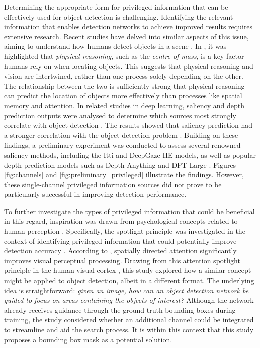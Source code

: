 Determining the appropriate form for privileged information that can be effectively used for object detection is challenging. Identifying the relevant information that enables detection networks to achieve improved results requires extensive research. Recent studies have delved into similar aspects of this issue, aiming to understand how humans detect objects in a scene \cite{object_detection_philospy}. In \cite{object_detection_philospy}, it was highlighted that \textit{physical reasoning}, such as the \textit{centre of mass}, is a key factor humans rely on when locating objects. This suggests that physical reasoning and vision are intertwined, rather than one process solely depending on the other. The relationship between the two is sufficiently strong that physical reasoning can predict the location of objects more effectively than processes like spatial memory and attention.
In related studies in deep learning, saliency \cite{itti, deepgaze} and depth prediction \cite{depth_anything, dpt_large} outputs were analysed to determine which sources most strongly correlate with object detection \cite{bartolo2024correlationobjectdetectionperformance}. The results showed that saliency prediction had a stronger correlation with the object detection problem \cite{bartolo2024correlationobjectdetectionperformance}. Building on these findings, a preliminary experiment was conducted to assess several renowned saliency methods, including the Itti \cite{itti} and DeepGaze IIE \cite{deepgaze} models, as well as popular depth prediction models such as Depth Anything \cite{depth_anything} and DPT-Large \cite{dpt_large}. Figures \ref{fig:channels} and \ref{fig:preliminary_privileged} illustrate the findings. However, these single-channel privileged information sources did not prove to be particularly successful in improving detection performance.

To further investigate the types of privileged information that could be beneficial in this regard, inspiration was drawn from psychological concepts related to human perception \cite{itti_ior, spotlight}. Specifically, the spotlight principle was investigated in the context of identifying privileged information that could potentially improve detection accuracy \cite{spotlight}. According to \cite{spotlight}, spatially directed attention significantly improves visual perceptual processing. Drawing from this attention spotlight principle in the human visual cortex \cite{spotlight}, this study explored how a similar concept might be applied to object detection, albeit in a different format. The underlying idea is straightforward: \textit{given an image, how can an object detection network be guided to focus on areas containing the objects of interest?}
Although the network already receives guidance through the ground-truth bounding boxes during training, the study considered whether an additional channel could be integrated to streamline and aid the search process. It is within this context that this study proposes a bounding box mask as a potential solution.

